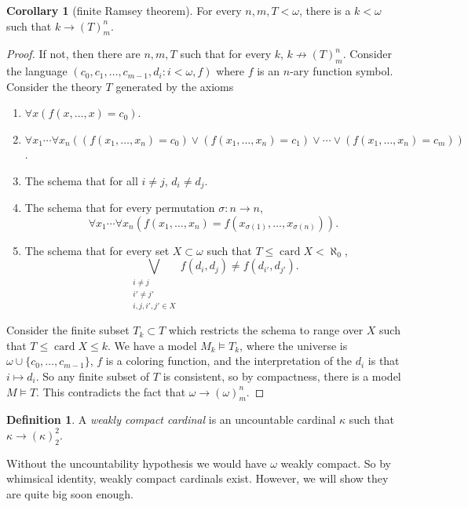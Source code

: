 \documentclass[12pt]{report}
\newcommand{\card}{\operatorname{card}}
\newcommand{\dfn}[1]{\emph{#1}\index{#1}}
\theoremstyle{definition}
\newtheorem{corollary}[theorem]{Corollary}
\newtheorem{definition}[theorem]{Definition}
\begin{document}
\begin{corollary}[finite Ramsey theorem]
For every $n, m, T < \omega$, there is a $k < \omega$ such that $k \to (T)^n_m$.
\end{corollary}
\begin{proof}
If not, then there are $n,m, T$ such that for every $k$, $k \not \to (T)^n_m$.
Consider the language $(c_0, c_1, \dots, c_{m-1}, d_i : i < \omega, f)$ where $f$ is an $n$-ary function symbol.
Consider the theory $T$ generated by the axioms
\begin{enumerate}
\item $\forall x(f(x, \dots, x) = c_0)$.
\item $\forall x_1 \cdots \forall x_n((f(x_1, \dots, x_n) = c_0) \vee (f(x_1, \dots, x_n) = c_1) \vee \cdots \vee (f(x_1, \dots, x_n) = c_m))$.
\item The schema that for all $i\neq j$, $d_i \neq d_j$.
\item The schema that for every permutation $\sigma: n \to n$,
$$\forall x_1 \cdots \forall x_n(f(x_1, \dots, x_n) = f(x_{\sigma(1)}, \dots, x_{\sigma(n)})).$$
\item The schema that for every set $X \subset \omega$ such that $T \leq \card X < \aleph_0$,
$$\bigvee_{\substack{i \neq j\\i' \neq j'\\i,j,i',j' \in X}} f(d_i, d_j) \neq f(d_{i'}, d_{j'}).$$
\end{enumerate}
Consider the finite subset $T_k \subset T$ which restricts the schema to range over $X$ such that $T \leq \card X \leq k$.
We have a model $M_k \models T_k$, where the universe is $\omega \cup \{c_0, \dots, c_{m-1}\}$, $f$ is a coloring function, and the interpretation of the $d_i$ is that $i \mapsto d_i$.
So any finite subset of $T$ is consistent, so by compactness, there is a model $M \models T$.
This contradicts the fact that $\omega \to (\omega)^n_m$.
\end{proof}
\begin{definition}
A \dfn{weakly compact cardinal} is an uncountable cardinal $\kappa$ such that $\kappa \to (\kappa)^2_2$.
\end{definition}
Without the uncountability hypothesis we would have $\omega$ weakly compact. So by whimsical identity, weakly compact cardinals exist.
However, we will show they are quite big soon enough.
\end{document}
